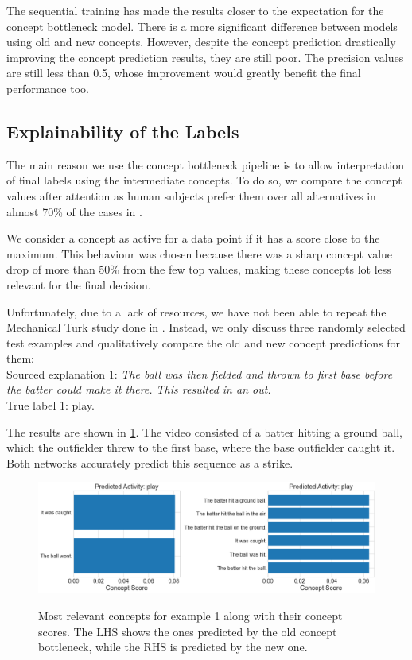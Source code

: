 The sequential training has made the results closer to the expectation for the concept bottleneck model. 
There is a more significant difference between models using old and new concepts.
However, despite the concept prediction drastically improving the concept prediction results, they are still poor.
The precision values are still less than 0.5, whose improvement would greatly benefit the final performance too.

\subsection{Explainability of the Labels}


The main reason we use the concept bottleneck pipeline is to allow interpretation of final labels using the intermediate concepts.
To do so, we compare the concept values after attention as human subjects prefer them over all alternatives in almost 70\% of the cases in \cite{RefWorks:RefID:16-2021automatic}.

We consider a concept as active for a data point if it has a score close to the maximum.
This behaviour was chosen because there was a sharp concept value drop of more than 50\% from the few top values, making these concepts lot less relevant for the final decision.


Unfortunately, due to a lack of resources, we have not been able to repeat the Mechanical Turk study done in \cite{RefWorks:RefID:16-2021automatic}. 
Instead, we only discuss three randomly selected test examples and qualitatively compare the old and new concept predictions for them: \\


Sourced explanation 1: \emph{The ball was then fielded and thrown to first base before the batter could make it there. This resulted in an out.}  \\
True label 1: play.

The results are shown in \ref{concepts-results-1}.
The video consisted of a batter hitting a ground ball, which the outfielder threw to the first base, where the base outfielder caught it.
Both networks accurately predict this sequence as a strike.

\begin{figure}[h]
\caption{Most relevant concepts for example 1 along with their concept scores. The LHS shows the ones predicted by the old concept bottleneck, while the RHS is predicted by the new one.}
\centering
\includegraphics[width=\textwidth]{concept-bottleneck-pipeline/explanations_concepts1.png}
\label{concepts-results-1}
\end{figure}

